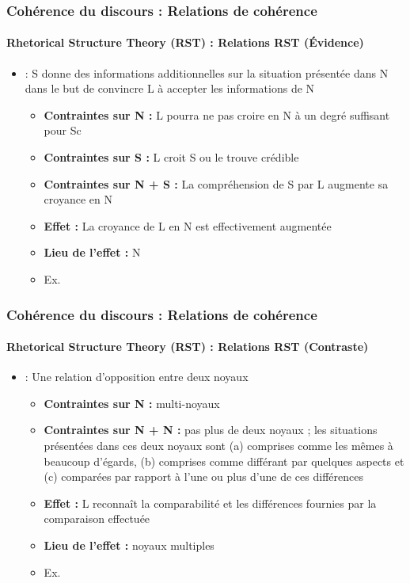\documentclass[xcolor=table]{beamer}
\begin{document}
\begin{frame}
	\frametitle{Cohérence du discours : Relations de cohérence}
	\framesubtitle{Rhetorical Structure Theory (RST) : Relations RST (Évidence)}
	
	\begin{itemize}
		\item {} :  S donne des informations additionnelles sur la situation présentée dans N dans le but de convincre L à accepter les informations de N
		\begin{itemize}
			\item \textbf{Contraintes sur N :} L pourra ne pas croire en N à un degré suffisant pour Sc
			\item \textbf{Contraintes sur S :} L croit S ou le trouve crédible
			\item \textbf{Contraintes sur N + S :} La compréhension de S par L augmente sa croyance en N
			\item \textbf{Effet :}  La croyance de L en N est effectivement augmentée
			\item \textbf{Lieu de l'effet :} N
			\item Ex. 
		\end{itemize}
	\end{itemize}
	
\end{frame}

\begin{frame}
	\frametitle{Cohérence du discours : Relations de cohérence}
	\framesubtitle{Rhetorical Structure Theory (RST) : Relations RST (Contraste)}
	
	\begin{itemize}
		\item {} :  Une relation d'opposition entre deux noyaux
		\begin{itemize}
			\item \textbf{Contraintes sur N :} multi-noyaux
			\item \textbf{Contraintes sur N + N :} pas plus de deux noyaux ; les situations présentées dans ces deux noyaux sont (a) comprises comme les mêmes à beaucoup d'égards, (b) comprises comme différant par quelques aspects et (c) comparées par rapport à l'une ou plus d'une de ces différences
			\item \textbf{Effet :}  L reconnaît la comparabilité et les différences fournies par la comparaison effectuée
			\item \textbf{Lieu de l'effet :} noyaux multiples
			\item Ex. 
		\end{itemize}
	\end{itemize}
	
\end{frame}
\end{document}
